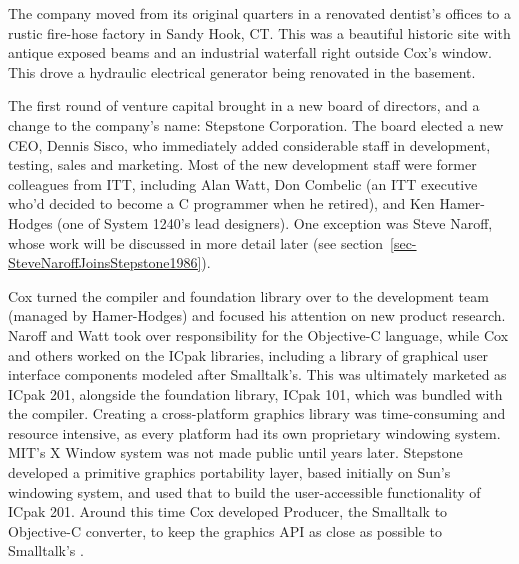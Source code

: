 \documentclass[acmsmall,screen]{acmart}
\begin{document}
The company moved from its original quarters in a renovated dentist's offices to a rustic fire-hose factory in Sandy Hook, CT. This was a beautiful historic site with antique exposed beams and an industrial waterfall right outside Cox's window. This drove a hydraulic electrical generator being renovated in the basement. 

The first round of venture capital brought in a new board of directors, and a change to the company's name: Stepstone Corporation. The board elected a new CEO, Dennis Sisco, who immediately added considerable staff in development, testing, sales and marketing. Most of the new development staff were former colleagues from ITT, including Alan Watt, Don Combelic (an ITT executive who'd decided to become a C programmer when he retired), and Ken Hamer-Hodges (one of System 1240's lead designers). One exception was Steve Naroff, whose work will be discussed in more detail later (see section~\ref{sec-SteveNaroffJoinsStepstone1986}).

Cox turned the compiler and foundation library over to the development team (managed by Hamer-Hodges) and focused his attention on new product research. Naroff and Watt took over responsibility for the Objective-C language, while Cox and others worked on the ICpak libraries, including a library of graphical user interface components modeled after Smalltalk's. This was ultimately marketed as ICpak 201, alongside the foundation library, ICpak 101, which was bundled with the compiler. Creating a cross-platform graphics library was time-consuming and resource intensive, as every platform had its own proprietary windowing system. MIT's X Window system was not made public until years later. Stepstone developed a primitive graphics portability layer, based initially on Sun's windowing system, and used that to build the user-accessible functionality of ICpak 201. Around this time Cox developed Producer, the Smalltalk to Objective-C converter, to keep the graphics API as close as possible to Smalltalk's  \citep{cox_producer:_1987}.
\end{document}
